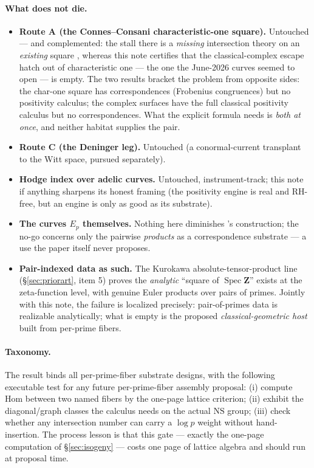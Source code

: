 \documentclass[11pt]{article}
\theoremstyle{definition}
\theoremstyle{remark}
\newcommand{\Z}{\mathbf{Z}}
\newcommand{\NS}{\mathrm{NS}}
\newcommand{\Hom}{\mathrm{Hom}}
\newcommand{\SpecZ}{\operatorname{Spec}\Z}
\begin{document}
\paragraph{What does not die.}
\begin{itemize}
\item \textbf{Route A (the Connes--Consani characteristic-one square).}
Untouched --- and complemented: the stall there is a \emph{missing}
intersection theory on an \emph{existing} square \cite{CC16}\cite[\S4.3.2]{CE15},
whereas this note certifies that the classical-complex escape hatch out of
characteristic one --- the one the June-2026 curves seemed to open --- is
empty. The two results bracket the problem from opposite sides: the char-one
square has correspondences (Frobenius congruences) but no positivity
calculus; the complex surfaces have the full classical positivity calculus
but no correspondences. What the explicit formula needs is \emph{both at
once}, and neither habitat supplies the pair.
\item \textbf{Route C (the Deninger leg).} Untouched (a conormal-current
transplant to the Witt space, pursued separately).
\item \textbf{Hodge index over adelic curves.} Untouched, instrument-track;
this note if anything sharpens its honest framing (the positivity engine is
real and RH-free, but an engine is only as good as its substrate).
\item \textbf{The curves $E_p$ themselves.} Nothing here diminishes
\cite{CC26}'s construction; the no-go concerns only the pairwise
\emph{products} as a correspondence substrate --- a use the paper itself
never proposes.
\item \textbf{Pair-indexed data as such.} The Kurokawa
absolute-tensor-product line (\S\ref{sec:priorart}, item 5) proves the
\emph{analytic} ``square of $\SpecZ$'' exists at the zeta-function level,
with genuine Euler products over pairs of primes. Jointly with this note,
the failure is localized precisely: pair-of-primes data is realizable
analytically; what is empty is the proposed \emph{classical-geometric host}
built from per-prime fibers.
\end{itemize}

\paragraph{Taxonomy.}
The result binds all per-prime-fiber substrate designs, with the following
executable test for any future per-prime-fiber assembly proposal: (i)
compute $\Hom$ between two named fibers by the one-page lattice criterion;
(ii) exhibit the diagonal/graph classes the calculus needs on the actual
$\NS$ group; (iii) check whether any intersection number can carry a
$\log p$ weight without hand-insertion. The process lesson is that this
gate --- exactly the one-page computation of \S\ref{sec:isogeny} --- costs
one page of lattice algebra and should run at proposal time.
\end{document}

